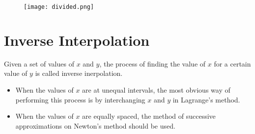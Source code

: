 \documentclass[aima203_lecturenotes_ku.tex]{subfiles}
\begin{document}
  \begin{figure}[h!]
  \centering
\texttt{[image: divided.png]}
\end{figure}

  \section{Inverse Interpolation}
  Given a set of values of $x$ and $y$, the process of finding the value of $x$ for a certain value of $y$ is called inverse inerpolation.
  \begin{itemize}
  \item When the values of $x$ are at unequal intervals, the most obvious way of performing this process is by interchanging $x$ and $y$ in Lagrange's method.
    \item When the values of $x$ are equally spaced, the method of successive approximations on Newton's method should be used.
  \end{itemize}
\end{document}
